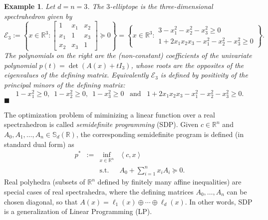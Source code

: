 \documentclass[a4paper,oneside,11pt]{article}
\newtheorem{example}[theorem]{Example}
\newcommand{\R}{\mathbb{R}} %
\newcommand{\sym}{\mathbb{S}} %
\newcommand{\exend}{\hfill $\blacksquare$}
\begin{document}
\begin{example}\label{ell3}
  Let $d=n=3$. The $3$-elliptope is the three-dimensional spectrahedron given by
  $$
  \mathcal{E}_3 :=
  \left\{
  x
  \in \R^3 :
  \begin{bmatrix}
    1 & x_1 & x_2 \\
    x_1 & 1 & x_3 \\
    x_2 & x_3 & 1
  \end{bmatrix}
  \succeq 0
  \right\}
  =
  \left\{
  x
  \in \R^3 :
  \begin{array}{r}
    3-x_1^2-x_2^2-x_3^2 \geq 0 \\
    1+2x_1x_2x_3-x_1^2-x_2^2-x_3^2 \geq 0
  \end{array}
  \right\}.
  $$
  The polynomials on the right are the (non-constant) coefficients of the univariate polynomial
  $p(t) = \det(A(x)+t I_3)$,
  whose roots are the opposites of the eigenvalues of the defining matrix. Equivalently $\mathcal{E}_3$
  is defined by positivity of the principal minors of the defining matrix:
  $$
  1-x_1^2 \geq 0, \,\,\, 1-x_2^2 \geq 0, \,\,\, 1-x_3^2 \geq 0 \,\,\, \text{ and } \,\,\, 1+2x_1x_2x_3-x_1^2-x_2^2-x_3^2 \geq 0.$$ \exend
\end{example}

The optimization problem of miminizing a linear function over a real spectrahedron is called \emph{semidefinite programming} (SDP). Given $c \in \R^n$ and $A_0,A_1,\ldots,A_n \in \sym_d(\R)$, the corresponding semidefinite program is defined (in standard dual form) as
\begin{equation}
  \label{SDP}
\begin{array}{rcll}
  p^* & := & \inf_{x \in \R^n} & \left\langle c, x \right\rangle \\
  &    & \text{s.t.}         & A_0+\sum_{i=1}^n x_i A_i \succeq 0.
\end{array}
\end{equation}
Real polyhedra (subsets of $\R^n$ defined by finitely many affine inequalities) are special cases of real
spectrahedra, where the defining matrices $A_0, \ldots, A_n$ can be chosen diagonal, so that $A(x) =
\ell_1(x) \oplus \cdots \oplus \ell_d(x)$. In other words, SDP is a generalization of Linear Programming (LP).

\end{document}
